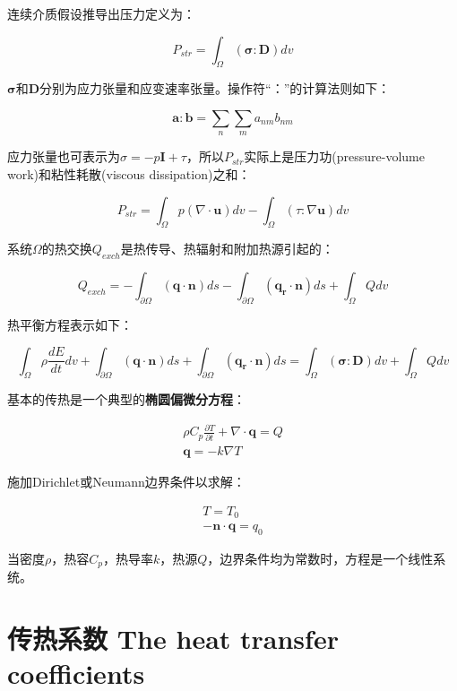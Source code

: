 连续介质假设推导出压力定义为：

\begin{equation}
    P_{str} = \int_{\Omega} (\bm{\sigma:D}) dv
\end{equation}

$\bm{\sigma}$和$\bm{D}$分别为应力张量和应变速率张量。操作符“：”的计算法则如下：

\begin{equation}
    \bm{a:b} = \sum_n \sum_m a_{nm}b_{nm}
\end{equation}

应力张量也可表示为$\sigma = -p\bm{I}+\tau$，所以$P_{str}$实际上是压力功(pressure-volume work)和粘性耗散(viscous
dissipation)之和：

\begin{equation}
    P_{str} = \int_{\Omega} p(\nabla\cdot \bm{u}) dv - \int_{\Omega}(\tau:\nabla \bm{u}) dv
\end{equation}

系统$\Omega$的热交换$Q_{exch}$是热传导、热辐射和附加热源引起的：

\begin{equation}
    Q_{exch} = - \int_{\partial\Omega} (\bm{q\cdot n}) ds - \int_{\partial\Omega} (\bm{q_r\cdot n}) ds + \int_{\Omega}Q dv
\end{equation}

热平衡方程表示如下：

\begin{equation}
    \int_{\Omega} \rho \frac{dE}{dt} dv + \int_{\partial\Omega} (\bm{q\cdot n}) ds + \int_{\partial\Omega} (\bm{q_r\cdot n}) ds = \int_{\Omega} (\bm{\sigma:D}) dv + \int_{\Omega} Q dv
\end{equation}

基本的传热是一个典型的\textbf{椭圆偏微分方程}：

\begin{gather}
    \rho C_p \frac{\partial T}{\partial t} + \nabla\cdot \bm{q} = Q \\
    \bm{q} = -k \nabla T
\end{gather}

施加Dirichlet或Neumann边界条件以求解：

\begin{gather}
    T = T_0\\
    -\bm{n\cdot q} = q_0
\end{gather}

当密度$\rho$，热容$C_p$，热导率$k$，热源$Q$，边界条件均为常数时，方程是一个线性系统。

\section{传热系数 The heat transfer coefficients}

